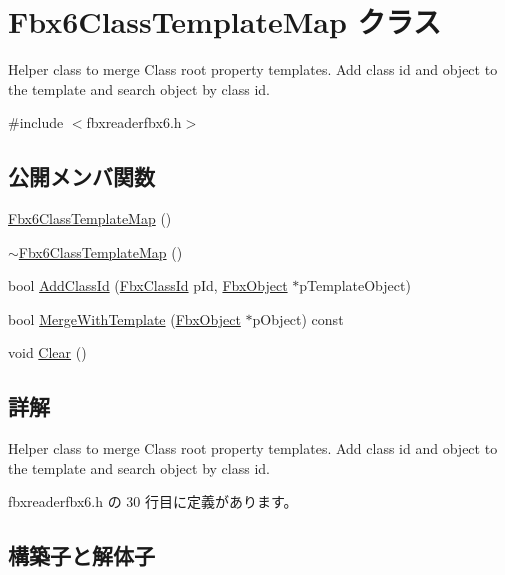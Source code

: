 \hypertarget{class_fbx6_class_template_map}{}\section{Fbx6\+Class\+Template\+Map クラス}
\label{class_fbx6_class_template_map}


Helper class to merge Class root property templates. Add class id and object to the template and search object by class id.  




{\ttfamily \#include $<$fbxreaderfbx6.\+h$>$}

\subsection*{公開メンバ関数}
\begin{DoxyCompactItemize}
\item 
\hyperlink{class_fbx6_class_template_map_a797c75312154457d38978b6c4046891e}{Fbx6\+Class\+Template\+Map} ()
\item 
\hyperlink{class_fbx6_class_template_map_af1b623f6de8fefd4c4515a66e40a2bec}{$\sim$\+Fbx6\+Class\+Template\+Map} ()
\item 
bool \hyperlink{class_fbx6_class_template_map_a064f7a5f731932c34a257fe9947c3981}{Add\+Class\+Id} (\hyperlink{class_fbx_class_id}{Fbx\+Class\+Id} p\+Id, \hyperlink{class_fbx_object}{Fbx\+Object} $\ast$p\+Template\+Object)
\item 
bool \hyperlink{class_fbx6_class_template_map_a93b436ce1ce8f65302b675cb3a085134}{Merge\+With\+Template} (\hyperlink{class_fbx_object}{Fbx\+Object} $\ast$p\+Object) const
\item 
void \hyperlink{class_fbx6_class_template_map_a522d86033875290b78d0034909997fde}{Clear} ()
\end{DoxyCompactItemize}


\subsection{詳解}
Helper class to merge Class root property templates. Add class id and object to the template and search object by class id. 

 fbxreaderfbx6.\+h の 30 行目に定義があります。



\subsection{構築子と解体子}
\mbox{\label{class_fbx6_class_template_map_a797c75312154457d38978b6c4046891e}} 
